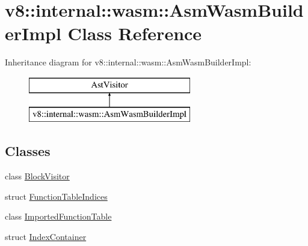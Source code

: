 \hypertarget{classv8_1_1internal_1_1wasm_1_1_asm_wasm_builder_impl}{}\section{v8\+:\+:internal\+:\+:wasm\+:\+:Asm\+Wasm\+Builder\+Impl Class Reference}
\label{classv8_1_1internal_1_1wasm_1_1_asm_wasm_builder_impl}
Inheritance diagram for v8\+:\+:internal\+:\+:wasm\+:\+:Asm\+Wasm\+Builder\+Impl\+:\begin{figure}[H]
\begin{center}
\leavevmode
\includegraphics[height=2.000000cm]{classv8_1_1internal_1_1wasm_1_1_asm_wasm_builder_impl}
\end{center}
\end{figure}
\subsection*{Classes}
\begin{DoxyCompactItemize}
\item 
class \hyperlink{classv8_1_1internal_1_1wasm_1_1_asm_wasm_builder_impl_1_1_block_visitor}{Block\+Visitor}
\item 
struct \hyperlink{structv8_1_1internal_1_1wasm_1_1_asm_wasm_builder_impl_1_1_function_table_indices}{Function\+Table\+Indices}
\item 
class \hyperlink{classv8_1_1internal_1_1wasm_1_1_asm_wasm_builder_impl_1_1_imported_function_table}{Imported\+Function\+Table}
\item 
struct \hyperlink{structv8_1_1internal_1_1wasm_1_1_asm_wasm_builder_impl_1_1_index_container}{Index\+Container}
\end{DoxyCompactItemize}
